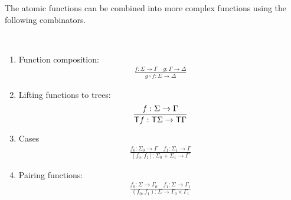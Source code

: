 \begin{definition}
\begin{enumerate}

\end{enumerate}
\end{definition}



The atomic functions can be combined into more complex functions using the following combinators.
\begin{definition}
     [Combinators] \label{def:combinators} \ 
    \begin{enumerate}
    \item Function composition:
    \begin{align*}
    \frac{f : \Sigma \to \Gamma \quad g : \Gamma \to \Delta} {g \circ f : \Sigma \to \Delta}
\end{align*}

\item Lifting functions to trees:
\begin{align*}
    \frac{f : \Sigma \to \Gamma} {\mathsf T f : \mathsf T \Sigma \to \mathsf T \Gamma}
\end{align*}
\item Cases
\begin{align*}
    \frac{f_0 : \Sigma_0 \to \Gamma \quad f_1 : \Sigma_1 \to \Gamma} {[f_0,f_1] : \Sigma_0 + \Sigma_1 \to \Gamma}
\end{align*}

\item Pairing functions:
\begin{align*}
    \frac{f_0 : \Sigma \to \Gamma_0 \quad f_1 : \Sigma \to \Gamma_1} {(f_0,f_1) : \Sigma \to \Gamma_0 \times \Gamma_1}
\end{align*}

\end{enumerate}
\end{definition}

